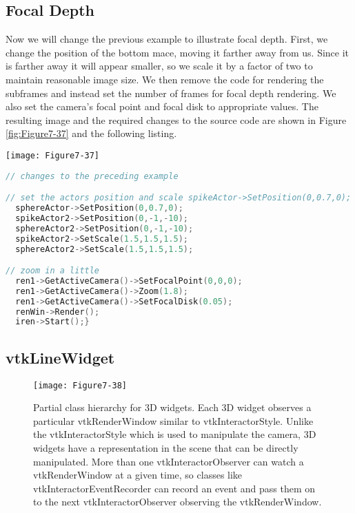 \subsection{Focal Depth}

\begin{minipage}[b]{0.5\linewidth}
	Now we will change the previous example to illustrate focal depth. First, we change the position of the bottom mace, moving it farther away from us. Since it is farther away it will appear smaller, so we scale it by a factor of two to maintain reasonable image size. We then remove the code for rendering the subframes and instead set the number of frames for focal depth rendering. We also set the camera's focal point and focal disk to appropriate values. The resulting image and the required changes to the source code are shown in Figure \ref{fig:Figure7-37} and the following listing.
\end{minipage}
\hfill
\begin{minipage}[b]{0.4\linewidth}
	\centering
	\texttt{[image: Figure7-37]}
	\label{fig:Figure7-37}
\end{minipage}

\begin{lstlisting}[language=C++, caption={An example of a scene rendered with focal depth.}]
// changes to the preceding example

// set the actors position and scale spikeActor->SetPosition(0,0.7,0);
  sphereActor->SetPosition(0,0.7,0);
  spikeActor2->SetPosition(0,-1,-10);
  sphereActor2->SetPosition(0,-1,-10);
  spikeActor2->SetScale(1.5,1.5,1.5);
  sphereActor2->SetScale(1.5,1.5,1.5);

// zoom in a little
  ren1->GetActiveCamera()->SetFocalPoint(0,0,0);
  ren1->GetActiveCamera()->Zoom(1.8);
  ren1->GetActiveCamera()->SetFocalDisk(0.05);
  renWin->Render();
  iren->Start();}
\end{lstlisting}

\subsection{vtkLineWidget}

\begin{figure}[!htb]
	\centering
	\texttt{[image: Figure7-38]}\\
	\caption{Partial class hierarchy for 3D widgets. Each 3D widget observes a particular vtkRenderWindow similar to vtkInteractorStyle. Unlike the vtkInteractorStyle which is used to manipulate the camera, 3D widgets have a representation in the scene that can be directly manipulated. More than one vtkInteractorObserver can watch a vtkRenderWindow at a given time, so classes like vtkInteractorEventRecorder can record an event and pass them on to the next vtkInteractorObserver observing the vtkRenderWindow.}\label{fig:Figure7-38}
\end{figure}

